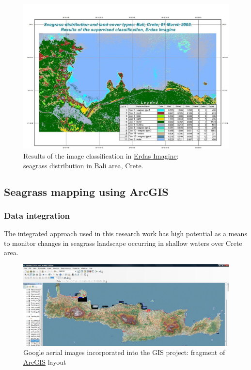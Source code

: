 \documentclass[10pt, a4paper]{article}
\begin{document}
\begin{figure}
	\begin{center}
		\includegraphics[scale=0.40]{Fig-36.jpg}
		\caption{Results of the image classification in \href{http://www.erdas.com/products/ERDASIMAGINE/ERDASIMAGINE/Details.aspx}{Erdas Imagine}: \\ seagrass distribution in Bali area, Crete. }
		\label{fig:39}
	\end{center}
\end{figure}

\subsection{Seagrass mapping using ArcGIS}

\subsubsection{Data integration}
The integrated approach used in this research work has high potential as a means to monitor changes
in seagrass landscape occurring in shallow waters over Crete area.

\begin{figure}
	\begin{center}
		\includegraphics[scale=0.25]{Fig-37.jpg}
		\caption{Google aerial images incorporated into the GIS project: fragment of \href{http://www.esri.com/software/arcgis/index.html}{ArcGIS} layout}
		\label{fig:4.17}
	\end{center}
\end{figure}
\end{document}
